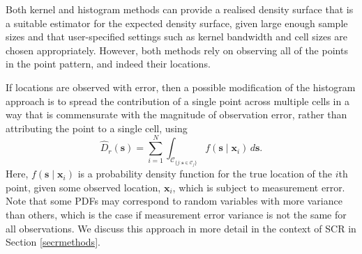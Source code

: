 \documentclass[useAMS,usenatbib,referee]{biom}
\begin{document}
Both kernel and histogram methods can provide a realised density surface that is a suitable estimator for the expected density surface, given large enough sample sizes and that user-specified settings such as kernel bandwidth and cell sizes are chosen appropriately. However, both methods rely on observing all of the points in the point pattern, and indeed their locations.

If locations are observed with error, then a possible modification of the histogram approach is to spread the contribution of a single point across multiple cells in a way that is commensurate with the magnitude of observation error, rather than attributing the point to a single cell, using
\begin{equation}
  \widehat{D}_r(\bm{s}) = \sum_{i = 1}^N \int_{\mathcal{C}_{\{j: \bm{s} \in \mathcal{C}_j\}}}  f(\bm{s} \mid \bm{x}_i) \, d\bm{s}. \label{eq:realised-D-error}
\end{equation}
Here, $f(\bm{s} \mid \bm{x}_i)$ is a probability density function for the true location of the $i$th point, given some observed location, $\bm{x}_i$, which is subject to measurement error. Note that some PDFs may correspond to random variables with more variance than others, which is the case if measurement error variance is not the same for all observations. We discuss this approach in more detail in the context of SCR in Section \ref{secrmethods}.
\end{document}
